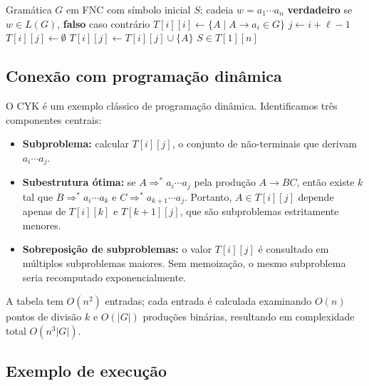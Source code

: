 \begin{algorithm}[H]
\caption{Algoritmo CYK}
\begin{algorithmic}[1]
\Require Gramática $G$ em FNC com símbolo inicial $S$; cadeia $w = a_1 \cdots a_n$
\Ensure \textbf{verdadeiro} se $w \in L(G)$, \textbf{falso} caso contrário
  \State $T[i][i] \leftarrow \{A \mid A \to a_i \in G\}$
\EndFor
{}
    \State $j \leftarrow i + \ell - 1$
    \State $T[i][j] \leftarrow \emptyset$
          \State $T[i][j] \leftarrow T[i][j] \cup \{A\}$
        \EndIf
      \EndFor
    \EndFor
  \EndFor
\EndFor
\Return $S \in T[1][n]$
\end{algorithmic}
\end{algorithm}

\subsection{Conexão com programação dinâmica}

O CYK é um exemplo clássico de programação dinâmica. Identificamos três componentes centrais:

\begin{itemize}
  \item \textbf{Subproblema:} calcular $T[i][j]$, o conjunto de não-terminais que derivam $a_i \cdots a_j$.
  \item \textbf{Subestrutura ótima:} se $A \Rightarrow^* a_i \cdots a_j$ pela produção $A \to BC$, então existe $k$ tal que $B \Rightarrow^* a_i \cdots a_k$ e $C \Rightarrow^* a_{k+1} \cdots a_j$. Portanto, $A \in T[i][j]$ depende apenas de $T[i][k]$ e $T[k+1][j]$, que são subproblemas estritamente menores.
  \item \textbf{Sobreposição de subproblemas:} o valor $T[i][j]$ é consultado em múltiplos subproblemas maiores. Sem memoização, o mesmo subproblema seria recomputado exponencialmente.
\end{itemize}

A tabela tem $O(n^2)$ entradas; cada entrada é calculada examinando $O(n)$ pontos de divisão $k$ e $O(|G|)$ produções binárias, resultando em complexidade total $O(n^3 |G|)$.

\subsection{Exemplo de execução}


